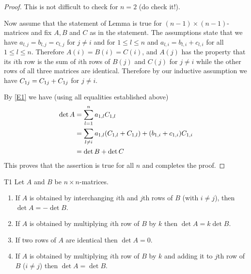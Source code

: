 \begin{proof}
  This is not difficult to check for $n=2$ (do check it!).

  Now assume that the statement of Lemma is true for
  $(n-1)\times (n-1)$-matrices and fix $A,B$ and $C$ as in the
  statement.  The assumptions state that we have
  $a_{l,j}=b_{l,j}=c_{l,j}$ for $j\neq i$ and for $1\leq l\leq n$ and
  $a_{l,i}=b_{l,i}+c_{l,i}$ for all $1\leq l\leq n$.  Therefore
  $A(i)=B(i)=C(i)$, and $A(j)$ has the property that its $i$th row is
  the sum of $i$th rows of $B(j)$ and $C(j)$ for $j\neq i$ while the
  other rows of all three matrices are identical.  Therefore by our
  inductive assumption we have $\cof{A}{1j}=\cof{B}{1j}+\cof{C}{1j}$
  for $j\neq i$.

  By \eqref{E1} we have (using all equalities established above)
  \begin{align*}
    \det A&=\sum_{l=1}^n a_{1,l} \cof{A}{1,l}\\
          &=\sum_{l\neq i} a_{1,l}(\cof{B}{1,l}+\cof{C}{1,l})+
            (b_{1,i}+c_{1,i})\cof{A}{1,i}\\
          &=
            \det B+\det C
  \end{align*}
  This proves that the assertion is true for all $n$ and completes the
  proof.
\end{proof}

\begin{theorem}{} {T1}
  Let $A$ and $B$ be $n\times n$-matrices.
  \begin{enumerate}
  \item If $A$ is obtained by interchanging $i$th and $j$th rows of
    $B$ (with $i\neq j$), then $\det A=-\det B$.
  \item If $A$ is obtained by multiplying $i$th row of $B$ by $k$ then
    $\det A=k\det B$.
  \item If two rows of $A$ are identical then $\det A=0$.
  \item If $A$ is obtained by multiplying $i$th row of $B$ by $k$ and
    adding it to $j$th row of $B$ ($i\neq j$) then $\det A=\det B$.
  \end{enumerate}
\end{theorem}

